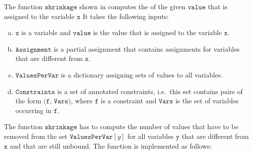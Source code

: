 \noindent
The function $\texttt{shrinkage}$ shown in  computes
the  of the given $\texttt{value}$ that is assigned to the variable $\texttt{x}$
It takes the following inputs:
\begin{enumerate}[(a)]
\item $\texttt{x}$ is a variable and $\texttt{value}$ is the value that is assigned to the variable $\texttt{x}$.
\item $\texttt{Assignment}$ is a partial assignment that contains assignments for variables that are
      different from $\texttt{x}$.
\item $\texttt{ValuesPerVar}$ is a dictionary assigning sets of values to all variables.
\item $\texttt{Constraints}$ is a set of annotated constraints, i.e.~this set contains pairs of the form 
      $\texttt{(f, Vars)}$, where $\texttt{f}$ is a constraint and $\texttt{Vars}$ is the set of
      variables occurring in $\texttt{f}$.
\end{enumerate}
The function $\texttt{shrinkage}$ has to compute the number of values that have to be removed from the set
$\texttt{ValuesPerVar}[y]$ for all variables $\texttt{y}$ that are different from $\texttt{x}$ and that are
still unbound.  The function is implemented as follows:
